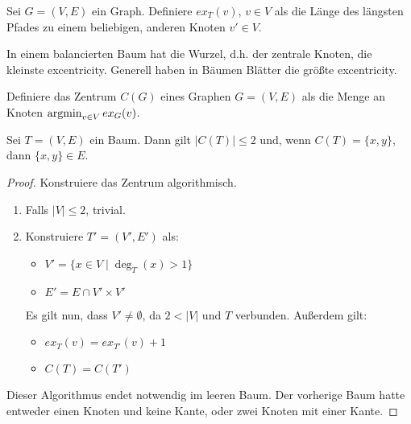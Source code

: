 \begin{definition}[Excentricity]
    Sei $ G = (V, E) $ ein Graph.
    Definiere $ ex_T(v) $, $ v \in V $ als die Länge des längsten Pfades zu einem beliebigen, anderen Knoten $ v' \in V $.
\end{definition}

\begin{remark}
    In einem balancierten Baum hat die Wurzel, d.h. der zentrale Knoten, die kleinste excentricity.
    Generell haben in Bäumen Blätter die größte excentricity.
\end{remark}

\begin{definition}[Zentrum]
    Definiere das Zentrum $ C(G) $ eines Graphen $ G = (V, E) $ als die Menge an Knoten $ \operatorname*{argmin}_{v \in V} ex_G(v) $.
\end{definition}

\begin{lemma}
    Sei $ T = (V, E) $ ein Baum.
    Dann gilt $ |C(T)| \leq 2 $ und, wenn $ C(T) = \{ x, y \} $, dann $ \{ x, y \} \in E $.
\end{lemma}

\begin{proof}
    Konstruiere das Zentrum algorithmisch.
    \begin{enumerate}
        \item Falls $ |V| \leq 2 $, trivial.
        \item Konstruiere $ T' = (V', E')$ als:
        \begin{itemize}
            \item $ V' = \{ x \in V \mid \deg_T(x) > 1 \} $
            \item $ E' = E \cap V' \times V' $
        \end{itemize}
        Es gilt nun, dass $ V' \ne \emptyset $, da $ 2 < |V| $ und $ T $ verbunden.
        Außerdem gilt:
        \begin{itemize}
            \item $ ex_T(v) = ex_{T'}(v) + 1 $
            \item $ C(T) = C(T') $
        \end{itemize}
    \end{enumerate}

    Dieser Algorithmus endet notwendig im leeren Baum.
    Der vorherige Baum hatte entweder einen Knoten und keine Kante, oder zwei Knoten mit einer Kante.
\end{proof}

